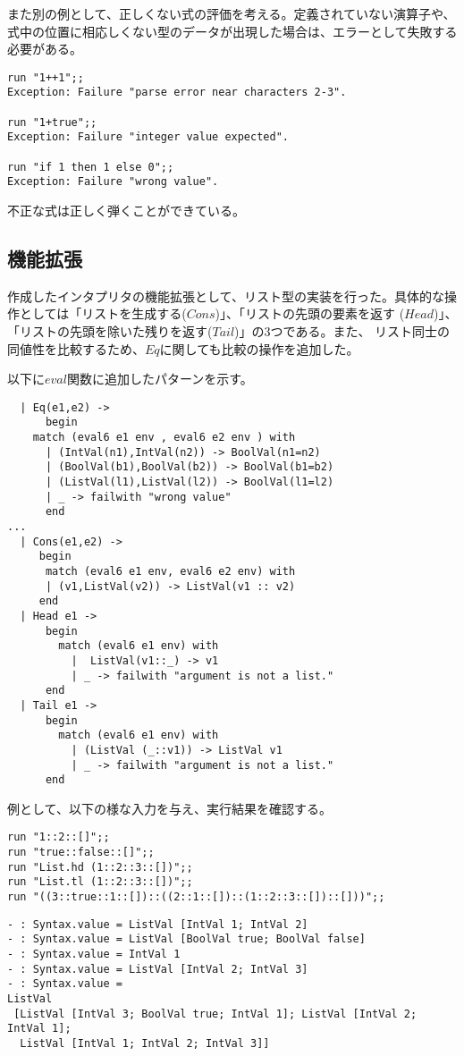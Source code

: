 \documentclass[a4paper,9pt]{jsarticle}
\begin{document}
また別の例として、正しくない式の評価を考える。定義されていない演算子や、
式中の位置に相応しくない型のデータが出現した場合は、エラーとして失敗する
必要がある。

\begin{lstlisting}
run "1++1";;
Exception: Failure "parse error near characters 2-3".

run "1+true";;
Exception: Failure "integer value expected".

run "if 1 then 1 else 0";;
Exception: Failure "wrong value".
\end{lstlisting}

不正な式は正しく弾くことができている。

\subsection{機能拡張}
作成したインタプリタの機能拡張として、リスト型の実装を行った。具体的な操
作としては「リストを生成する($Cons$)」、「リストの先頭の要素を返す
($Head$)」、「リストの先頭を除いた残りを返す($Tail$)」の3つである。また、
リスト同士の同値性を比較するため、$Eq$に関しても比較の操作を追加した。

以下に$eval$関数に追加したパターンを示す。

\begin{lstlisting}
  | Eq(e1,e2) ->
      begin
	match (eval6 e1 env , eval6 e2 env ) with
	  | (IntVal(n1),IntVal(n2)) -> BoolVal(n1=n2)
	  | (BoolVal(b1),BoolVal(b2)) -> BoolVal(b1=b2)
	  | (ListVal(l1),ListVal(l2)) -> BoolVal(l1=l2)
	  | _ -> failwith "wrong value"
      end
...
  | Cons(e1,e2) ->
     begin
      match (eval6 e1 env, eval6 e2 env) with
      | (v1,ListVal(v2)) -> ListVal(v1 :: v2)
     end
  | Head e1 ->
      begin
        match (eval6 e1 env) with
          |  ListVal(v1::_) -> v1
          | _ -> failwith "argument is not a list."
      end     
  | Tail e1 ->
      begin
        match (eval6 e1 env) with
          | (ListVal (_::v1)) -> ListVal v1
          | _ -> failwith "argument is not a list."
      end
\end{lstlisting}

例として、以下の様な入力を与え、実行結果を確認する。

\begin{lstlisting}
run "1::2::[]";;
run "true::false::[]";;
run "List.hd (1::2::3::[])";;
run "List.tl (1::2::3::[])";;
run "((3::true::1::[])::((2::1::[])::(1::2::3::[])::[]))";;
\end{lstlisting}

\begin{lstlisting}
- : Syntax.value = ListVal [IntVal 1; IntVal 2]
- : Syntax.value = ListVal [BoolVal true; BoolVal false]
- : Syntax.value = IntVal 1
- : Syntax.value = ListVal [IntVal 2; IntVal 3]
- : Syntax.value =
ListVal
 [ListVal [IntVal 3; BoolVal true; IntVal 1]; ListVal [IntVal 2; IntVal 1];
  ListVal [IntVal 1; IntVal 2; IntVal 3]]
\end{lstlisting}
\end{document}
